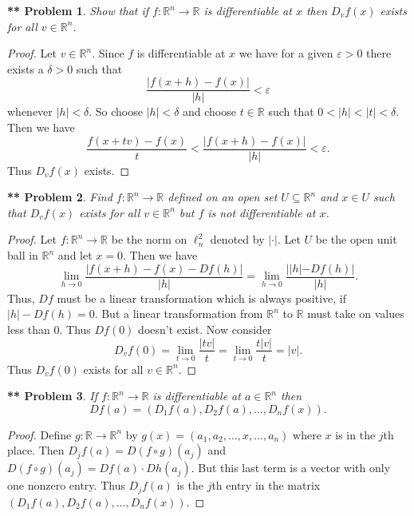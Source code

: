 \documentclass{article}
\newtheorem{**}{** Problem}
\begin{document}
\begin{flushleft}
\begin{**}
Show that if $f : \mathbb{R}^n \rightarrow \mathbb{R}$ is differentiable at $x$ then $D_vf(x)$ exists for all $v \in \mathbb{R}^n$.
\end{**}
\begin{proof}
Let $v \in \mathbb{R}^n$. Since $f$ is differentiable at $x$ we have for a given $\varepsilon > 0$ there exists a $\delta > 0$ such that
\[
\frac{|f(x+h) - f(x)|}{|h|} < \varepsilon
\]
whenever $|h| < \delta$. So choose $|h| < \delta$ and choose $t \in \mathbb{R}$ such that $0 < |h| < |t| < \delta$. Then we have
\[
\frac{f(x+tv) - f(x)}{t} < \frac{|f(x+h) - f(x)|}{|h|} < \varepsilon.
\]
Thus $D_vf(x)$ exists.
\end{proof}

\begin{**}
Find $f : \mathbb{R}^n \rightarrow \mathbb{R}$ defined on an open set $U \subseteq \mathbb{R}^n$ and $x \in U$ such that $D_vf(x)$ exists for all $v \in \mathbb{R}^n$ but $f$ is not differentiable at $x$.
\end{**}
\begin{proof}
Let $f : \mathbb{R}^n \rightarrow \mathbb{R}$ be the norm on $\ell_n^2$ denoted by $| \cdot |$. Let $U$ be the open unit ball in $\mathbb{R}^n$ and let $x = 0$. Then we have
\[
\lim_{h \rightarrow 0} \frac{|f(x+h) - f(x) - Df(h)|}{|h|} = \lim_{h \rightarrow 0} \frac{||h| - Df(h)|}{|h|}.
\]
Thus, $Df$ must be a linear transformation which is always positive, if $|h| - Df(h) = 0$. But a linear transformation from $\mathbb{R}^n$ to $\mathbb{R}$ must take on values less than $0$. Thus $Df(0)$ doesn't exist. Now consider
\[
D_vf(0) = \lim_{t \rightarrow 0} \frac{|tv|}{t} = \lim_{t \rightarrow 0} \frac{t|v|}{t} = |v|.
\]
Thus $D_vf(0)$ exists for all $v \in \mathbb{R}^n$.
\end{proof}

\begin{**}
If $f : \mathbb{R}^n \rightarrow \mathbb{R}$ is differentiable at $a \in \mathbb{R}^n$ then
\[
Df(a) = (D_1 f(a) , D_2 f(a), \dots , D_n f(x)).
\]
\end{**}
\begin{proof}
Define $g : \mathbb{R} \rightarrow \mathbb{R}^n$ by $g(x) = (a_1, a_2, \dots , x , \dots , a_n)$ where $x$ is in the $j$th place. Then $D_j f(a) = D(f \circ g) (a_j)$ and $D(f \circ g)(a_j) = Df(a) \cdot Dh(a_j)$. But this last term is a vector with only one nonzero entry. Thus $D_j f(a)$ is the $j$th entry in the matrix $(D_1 f(a) , D_2 f(a), \dots , D_n f(x))$.
\end{proof}

\end{flushleft}
\end{document}
